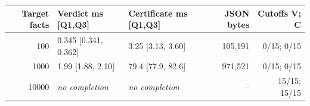 \begin{tabular}{rllrr}
\toprule
Target facts & Verdict ms [Q1,Q3] & Certificate ms [Q1,Q3] & JSON bytes & Cutoffs V; C \\
\midrule
100 & 0.345 [0.341, 0.362] & 3.25 [3.13, 3.60] & 105,191 & 0/15; 0/15 \\
1000 & 1.99 [1.88, 2.10] & 79.4 [77.9, 82.6] & 971,521 & 0/15; 0/15 \\
10000 & \textit{no completion} & \textit{no completion} & -- & 15/15; 15/15 \\
\bottomrule
\end{tabular}
